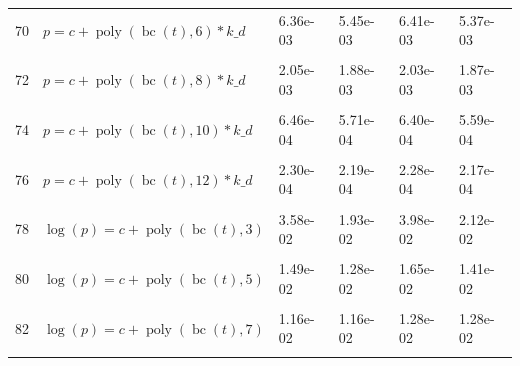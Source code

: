 \documentclass[12pt,a4paper]{article}
\DeclareMathOperator{\bc}{bc}
\DeclareMathOperator{\poly}{poly}
\begin{document}
\begin{longtable}[t]{ll>{\raggedleft\arraybackslash}p{2cm}>{\raggedleft\arraybackslash}p{2cm}>{\raggedleft\arraybackslash}p{2cm}>{\raggedleft\arraybackslash}p{2cm}}
70 & $p = c + \poly\left( \bc(t), 6 \right) * k\_d$ & 6.36e-03 & 5.45e-03 & 6.41e-03 & 5.37e-03\\
\cellcolor{gray!6}{71} & \cellcolor{gray!6}{$p = c + \poly\left( \bc(t), 7 \right) * k\_d$} & \cellcolor{gray!6}{5.47e-03} & \cellcolor{gray!6}{4.60e-03} & \cellcolor{gray!6}{4.39e-03} & \cellcolor{gray!6}{4.00e-03}\\
72 & $p = c + \poly\left( \bc(t), 8 \right) * k\_d$ & 2.05e-03 & 1.88e-03 & 2.03e-03 & 1.87e-03\\
\cellcolor{gray!6}{73} & \cellcolor{gray!6}{$p = c + \poly\left( \bc(t), 9 \right) * k\_d$} & \cellcolor{gray!6}{1.76e-03} & \cellcolor{gray!6}{1.61e-03} & \cellcolor{gray!6}{1.38e-03} & \cellcolor{gray!6}{1.30e-03}\\
74 & $p = c + \poly\left( \bc(t), 10 \right) * k\_d$ & 6.46e-04 & 5.71e-04 & 6.40e-04 & 5.59e-04\\
\cellcolor{gray!6}{75} & \cellcolor{gray!6}{$p = c + \poly\left( \bc(t), 11 \right) * k\_d$} & \cellcolor{gray!6}{5.26e-04} & \cellcolor{gray!6}{4.66e-04} & \cellcolor{gray!6}{4.06e-04} & \cellcolor{gray!6}{3.82e-04}\\
76 & $p = c + \poly\left( \bc(t), 12 \right) * k\_d$ & 2.30e-04 & 2.19e-04 & 2.28e-04 & 2.17e-04\\
\cellcolor{gray!6}{77} & \cellcolor{gray!6}{$p = c + \poly\left( \bc(t), 13 \right) * k\_d$} & \cellcolor{gray!6}{1.88e-04} & \cellcolor{gray!6}{1.81e-04} & \cellcolor{gray!6}{1.70e-04} & \cellcolor{gray!6}{1.68e-04}\\
78 & $\log(p) = c + \poly\left( \bc(t), 3 \right)$ & 3.58e-02 & 1.93e-02 & 3.98e-02 & 2.12e-02\\
\cellcolor{gray!6}{79} & \cellcolor{gray!6}{$\log(p) = c + \poly\left( \bc(t), 4 \right)$} & \cellcolor{gray!6}{2.35e-02} & \cellcolor{gray!6}{2.34e-02} & \cellcolor{gray!6}{2.61e-02} & \cellcolor{gray!6}{2.60e-02}\\
80 & $\log(p) = c + \poly\left( \bc(t), 5 \right)$ & 1.49e-02 & 1.28e-02 & 1.65e-02 & 1.41e-02\\
\cellcolor{gray!6}{81} & \cellcolor{gray!6}{$\log(p) = c + \poly\left( \bc(t), 6 \right)$} & \cellcolor{gray!6}{1.15e-02} & \cellcolor{gray!6}{1.15e-02} & \cellcolor{gray!6}{1.26e-02} & \cellcolor{gray!6}{1.26e-02}\\
82 & $\log(p) = c + \poly\left( \bc(t), 7 \right)$ & 1.16e-02 & 1.16e-02 & 1.28e-02 & 1.28e-02\\
\cellcolor{gray!6}{83} & \cellcolor{gray!6}{$\log(p) = c + \poly\left( \bc(t), 8 \right)$} & \cellcolor{gray!6}{1.15e-02} & \cellcolor{gray!6}{1.15e-02} & \cellcolor{gray!6}{1.26e-02} & \cellcolor{gray!6}{1.26e-02}\\

\end{longtable}
\end{document}
